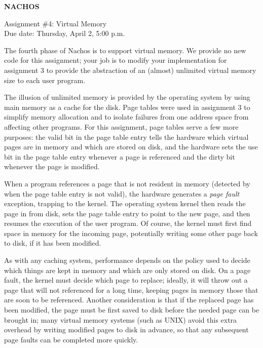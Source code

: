 	


\begin{center}
{\large {\bf NACHOS}}


\vspace{.5in}
Assignment \#4: Virtual Memory \\
Due date: Thursday, April 2, 5:00 p.m. \\
\end{center}

\vspace{.2in}

The fourth phase of Nachos is to support virtual memory.
We provide no new code for this assignment; your job is
to modify your implementation for assignment 3 to provide
the abstraction of an (almost) unlimited virtual memory size
to each user program.  

The illusion of unlimited memory is provided by the operating system
by using main memory as a cache for the disk.
Page tables were used in assignment 3 to simplify memory 
allocation and to isolate failures from one address space from 
affecting other programs.  For this assignment, page tables 
serve a few more purposes: the valid bit in the page table entry tells
the hardware which virtual pages are in memory and which are stored on disk,
and the hardware sets the use bit in the page table entry whenever
a page is referenced and the dirty bit whenever the page is modified.

When a program references a page that is not resident in memory
(detected by when the page table entry is not valid), the hardware
generates a {\em page fault} exception, trapping to the kernel.
The operating system kernel then reads the page in from disk,
sets the page table entry to point to the new page, and then resumes 
the execution of the user program.  Of course, the kernel must  
first find space in memory for the incoming page, potentially
writing some other page back to disk, if it has been modified.

As with any caching system, performance depends on the policy
used to decide which things are kept in memory and which
are only stored on disk.  
On a page fault, the kernel must decide which page to replace;
ideally, it will throw out a page that will not referenced for 
a long time, keeping pages in memory those that are soon to be 
referenced.  Another consideration is that if the replaced page 
has been modified, the page must be first saved to disk before the needed
page can be brought in; many virtual memory systems (such as UNIX)
avoid this extra overhead by writing modified pages to disk in 
advance, so that any subsequent page faults can be completed more quickly.

